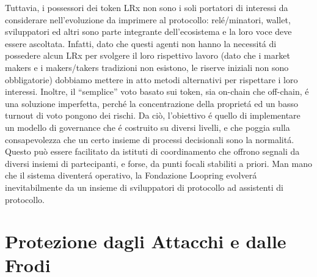 \documentclass[UTF8,nofonts]{article}
\begin{document}
\begin{multicols}{2}
Tuttavia, i possessori dei token LRx non sono i soli portatori di interessi da considerare nell'evoluzione da imprimere al protocollo: rel\'e/minatori, wallet, sviluppatori ed altri sono parte integrante dell'ecosistema e la loro voce deve essere ascoltata. Infatti, dato che questi agenti non hanno la necessit\'a di possedere alcun LRx per svolgere il loro rispettivo lavoro (dato che i market makers e i makers/takers tradizioni non esistono, le riserve iniziali non sono obbligatorie) dobbiamo mettere in atto metodi alternativi per rispettare i loro interessi.  Inoltre, il “semplice” voto basato sui token, sia on-chain che off-chain, \'e una soluzione imperfetta, perch\'e la concentrazione della propriet\'a ed un basso turnout di voto pongono dei rischi. Da ciò, l'obiettivo \'e quello di implementare un modello di governance che \'e costruito su diversi livelli, e che poggia sulla consapevolezza che un certo insieme di processi decisionali sono la normalit\'a. Questo può essere facilitato da istituti di coordinamento che offrono segnali da diversi insiemi di partecipanti, e forse, da punti focali stabiliti a priori. Man mano che il sistema diventer\'a operativo, la Fondazione Loopring evolver\'a inevitabilmente da un insieme di sviluppatori di protocollo ad assistenti di protocollo.

\section{Protezione dagli Attacchi e dalle Frodi}

\end{multicols}
\end{document}
